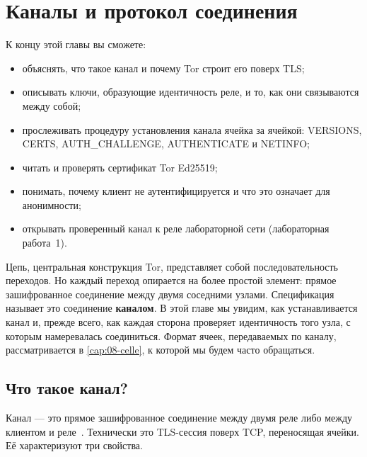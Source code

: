 \chapter{Каналы и протокол соединения}\label{cap:07-canali}

\begin{obiettivi}
К концу этой главы вы сможете:
\begin{itemize}[nosep]
  \item объяснять, что такое канал и почему Tor строит его поверх TLS;
  \item описывать ключи, образующие идентичность реле, и то, как они связываются между собой;
  \item прослеживать процедуру установления канала ячейка за ячейкой: VERSIONS, CERTS, AUTH\_CHALLENGE, AUTHENTICATE и NETINFO;
  \item читать и проверять сертификат Tor Ed25519;
  \item понимать, почему клиент не аутентифицируется и что это означает для анонимности;
  \item открывать проверенный канал к реле лабораторной сети (лабораторная работа~1).
\end{itemize}
\end{obiettivi}

Цепь, центральная конструкция Tor, представляет собой последовательность переходов. Но каждый переход опирается на более простой элемент: прямое зашифрованное соединение между двумя соседними узлами. Спецификация называет это соединение \textbf{каналом}. В этой главе мы увидим, как устанавливается канал и, прежде всего, как каждая сторона проверяет идентичность того узла, с которым намеревалась соединиться. Формат ячеек, передаваемых по каналу, рассматривается в \cref{cap:08-celle}, к которой мы будем часто обращаться.

\section{Что такое канал?}\label{sec:canale-def}

Канал --- это прямое зашифрованное соединение между двумя реле либо между клиентом и реле~. Технически это TLS-сессия поверх TCP, переносящая ячейки. Её характеризуют три свойства.

